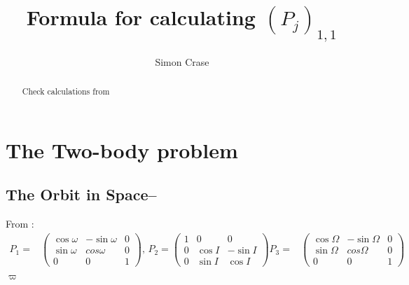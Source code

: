 \documentclass[]{article}
\title{Formula for calculating $(P_j)_{1,1}$}
\author{Simon Crase}
\begin{document}
\maketitle
\tableofcontents
\begin{abstract}
Check calculations from \cite{ssd}
\end{abstract}

\section{The Two-body problem}

\subsection{The Orbit in Space--\cite[2.8]{ssd}}

From  \cite[(2.119) and (2.120)]{ssd}:
\begin{align*}
P_1 =& \begin{pmatrix}
\cos \omega & - \sin \omega & 0\\
\sin \omega & cos \omega & 0\\
0 & 0  & 1
\end{pmatrix}
\text{, }
P_2 = \begin{pmatrix}
1 & 0 & 0\\
0 & \cos I & - \sin I\\
0 & \sin I & \cos I
\end{pmatrix}
P_3 =& \begin{pmatrix}
\cos \Omega & - \sin \Omega & 0\\
\sin \Omega & cos \Omega & 0\\
0 & 0  & 1
\end{pmatrix}
\end{align*}
$\varpi$
\end{document}

